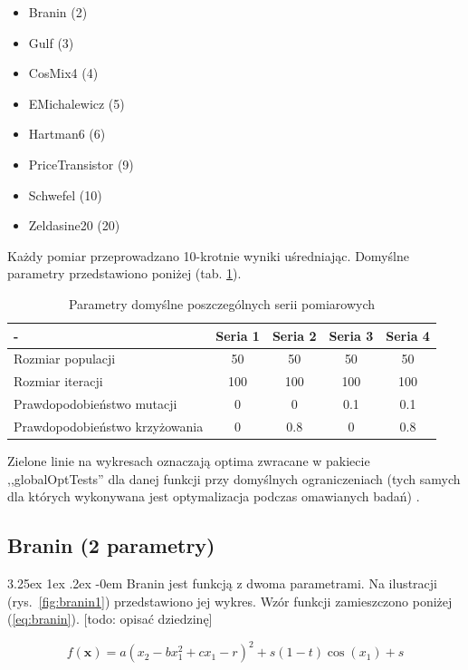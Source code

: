 \documentclass[11pt, a4paper]{article}
\makeatletter
\newcommand{\fbi}{\leavevmode{\parindent=1em\indent}}
\renewcommand\paragraph{\@startsection{paragraph}{5}{\z@}%
  {3.25ex \@plus1ex \@minus.2ex}%
  {-0em}%
  {\normalfont\normalsize\bfseries}}
\makeatother
\begin{document}
\begin{itemize}
	\item Branin (2)
	\item Gulf (3)
	\item CosMix4 (4)
	\item EMichalewicz (5)
	\item Hartman6 (6)
	\item PriceTransistor (9)
	\item Schwefel (10)
	\item Zeldasine20 (20)
\end{itemize}

\fbi
Każdy pomiar przeprowadzano 10-krotnie wyniki uśredniając. Domyślne parametry przedstawiono poniżej (tab. \ref{tab:parametry}).

\begin{table}[htbp]
	\centering
	\caption{Parametry domyślne poszczególnych serii pomiarowych}
	\label{tab:parametry}
	\begin{tabularx}{\textwidth}{|X|c|c|c|c|}
		\hline
		- & Seria 1 & Seria 2 & Seria 3 & Seria 4\\ 
		\hline
		Rozmiar populacji & 50 & 50 & 50 & 50 \\ 
		\hline 
		Rozmiar iteracji & 100 & 100 & 100 & 100 \\ 
		\hline 
		Prawdopodobieństwo mutacji & 0 & 0 & 0.1 & 0.1 \\ 
		\hline 
		Prawdopodobieństwo krzyżowania & 0 & 0.8 & 0 & 0.8 \\ 
		\hline 
	\end{tabularx} 
\end{table}

\fbi
Zielone linie na wykresach oznaczają optima zwracane w pakiecie ,,globalOptTests'' dla danej funkcji przy domyślnych ograniczeniach (tych samych dla których wykonywana jest optymalizacja podczas omawianych badań) .

\subsection{Branin (2 parametry)}
\paragraph{}
Branin jest funkcją z dwoma parametrami. Na ilustracji (rys.~\ref{fig:branin1}) przedstawiono jej wykres. Wzór funkcji zamieszczono poniżej (\ref{eq:branin}).
[todo: opisać dziedzinę]


\begin{equation}\label{eq:branin}
	f(\boldsymbol{x}) = a(x_2 - bx_1^2 + cx_1 - r)^2 + s(1 - t)\cos(x_1) + s
\end{equation}
\end{document}
